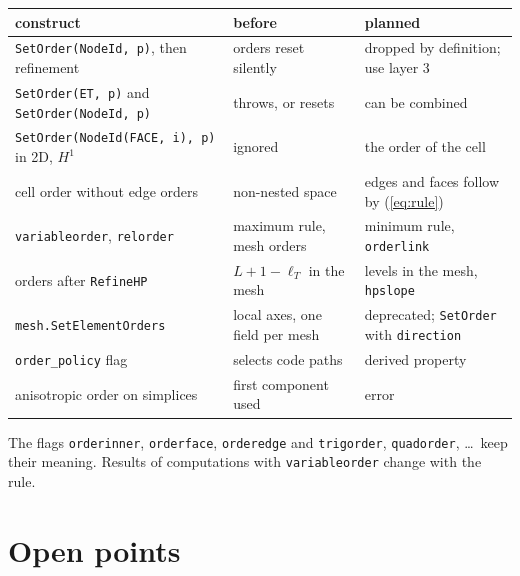 \documentclass[10pt,a4paper]{article}
\newcommand{\code}[1]{\texttt{#1}}
\begin{document}
\begin{center}\small
\begin{tabular}{@{}lll@{}}\toprule
construct & before & planned \\\midrule
\code{SetOrder(NodeId, p)}, then refinement & orders reset silently & dropped by definition; use layer 3 \\
\code{SetOrder(ET, p)} and \code{SetOrder(NodeId, p)} & throws, or resets & can be combined \\
\code{SetOrder(NodeId(FACE, i), p)} in 2D, $H^1$ & ignored & the order of the cell \\
cell order without edge orders & non-nested space & edges and faces follow by (\ref{eq:rule}) \\
\code{variableorder}, \code{relorder} & maximum rule, mesh orders & minimum rule, \code{orderlink} \\
orders after \code{RefineHP} & $L+1-\ell_T$ in the mesh & levels in the mesh, \code{hpslope} \\
\code{mesh.SetElementOrders} & local axes, one field per mesh & deprecated; \code{SetOrder} with \code{direction} \\
\code{order\_policy} flag & selects code paths & derived property \\
anisotropic order on simplices & first component used & error \\\bottomrule
\end{tabular}
\end{center}
The flags \code{orderinner}, \code{orderface}, \code{orderedge} and \code{trigorder}, \code{quadorder}, \dots\ keep their meaning. Results of computations with \code{variableorder} change with the rule.

\section{Open points}
\end{document}
